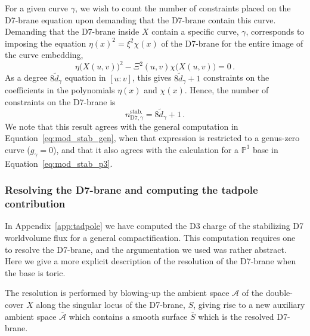 \documentclass[a4paper,12pt]{article}
\numberwithin{equation}{section}
\newcommand{\mc}{\mathcal}
\newcommand{\mbb}{\mathbb}
\newcommand{\be}{\begin{equation}}
\newcommand{\ee}{\end{equation}}
\newcommand{\cyu}{X}					%
\newcommand{\as}{\mc{A}}				%
\newcommand{\asl}{\overline{\mc{A}}}	%
\newcommand{\db}{S}					%
\newcommand{\dbl}{\overline{S}}		%
\newcommand{\crv}{\gamma}			%
\newcommand{\degr}[1]{\tilde{d}_{#1}}			%
\newcommand{\stbmod}[1]{n_{\mathrm{D7},{#1}}^\mathrm{stab.}}		%
\begin{document}
For a given curve $\crv$, we wish to count the number of constraints placed on the D7-brane equation upon demanding that the D7-brane contain this curve. Demanding that the D7-brane inside $\cyu$ contain a specific curve, $\crv$, corresponds to imposing the equation $\eta(x)^2 =\xi^2 \chi(x) $ of the D7-brane for the entire image of the curve embedding,
\be
\eta\big(X(u,v))^2 - \Xi^2 (u,v) \chi\big(X(u,v)\big) = 0 \,.
\ee
As a degree $8\degr{\crv} $ equation in $[u:v]$, this gives $8\degr{\crv} +1$ constraints on the coefficients in the polynomials $\eta(x)$ and $\chi(x)$. Hence, the number of constraints on the D7-brane is
\be
\stbmod{\crv} = 8\degr{\crv} +1 \,.
\label{eq:mod_stab_tor}
\ee
We note that this result agrees with the general computation in Equation~\eqref{eq:mod_stab_gen}, when that expression is restricted to a genus-zero curve ($g_\crv=0$), and that it also agrees with the calculation for a $\mbb{P}^3$ base  in Equation~\eqref{eq:mod_stab_p3}.


\subsubsection*{Resolving the D7-brane and computing the tadpole contribution}

In Appendix~\ref{app:tadpole} we have computed the D3 charge of the stabilizing D7 worldvolume flux for a general compactification. This computation requires one to resolve the D7-brane, and the argumentation we used was rather abstract. Here we give a more explicit description of the resolution of the D7-brane when the base is toric.

The resolution is performed by blowing-up the ambient space $\as$ of the double-cover $\cyu$ along the singular locus of the D7-brane, $\db$, giving rise to a new auxiliary ambient space $\asl$ which contains a smooth surface $\dbl$ which is the resolved D7-brane.
\end{document}
